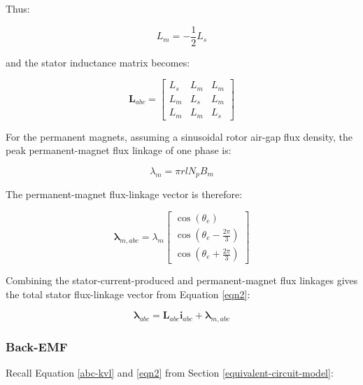 \documentclass{article}
\begin{document}
Thus:

\begin{equation}
    L_m = -\frac{1}{2}L_s
\end{equation}

and the stator inductance matrix becomes:

\begin{equation}
\mathbf{L}_{abc}
=
\begin{bmatrix}
L_s & L_m & L_m \\
L_m & L_s & L_m \\
L_m & L_m & L_s
\end{bmatrix}
\end{equation}

For the permanent magnets, assuming a sinusoidal rotor air-gap flux density, the peak permanent-magnet flux linkage of one phase is:

\begin{equation}
    \lambda_m = \pi r l N_p B_m
\end{equation}

The permanent-magnet flux-linkage vector is therefore:

\begin{equation}
\boldsymbol{\lambda}_{m,abc}
=
\lambda_m
\begin{bmatrix}
\cos(\theta_e) \\[4pt]
\cos\left(\theta_e-\frac{2\pi}{3}\right) \\[4pt]
\cos\left(\theta_e+\frac{2\pi}{3}\right)
\end{bmatrix}
\end{equation}

Combining the stator-current-produced and permanent-magnet flux linkages gives the total stator flux-linkage vector from Equation \ref{eqn2}:

\begin{equation}
    \boldsymbol{\lambda}_{abc} = \mathbf{L}_{abc}\mathbf{i}_{abc} + \boldsymbol{\lambda}_{m,abc}
\end{equation}

\subsubsection{Back-EMF}

Recall Equation \ref{abc-kvl} and \ref{eqn2} from Section \ref{equivalent-circuit-model}:
\end{document}

